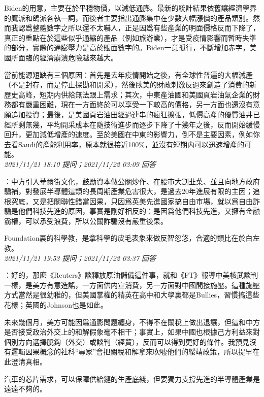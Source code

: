 \documentclass[twocolumn]{ctexart}
\begin{document}
Biden的用意，主要在於平穩物價，以減低通膨。最新的統計結果依舊讓經濟學界的鷹派和鴿派各執一詞，而後者主要指出通膨集中在少數大幅漲價的產品類別。然而我認爲整體數字之所以還不太嚇人，正是因爲有些產業的明面價格反而下降了，真正的重點在於這些似乎通縮的產品（例如旅游業），才是受疫情影響而暫時失準的部分，實際的通膨壓力是高於賬面數字的。Biden一意孤行，不斷增加赤字，美國所面臨的經濟崩潰危險越來越大。

當前能源短缺有三個原因：首先是去年疫情開始之後，有全球性普遍的大幅減產（不是封存，而是停止探勘和開采），然後歐美的財政刺激反過來創造了消費的新歷史高峰，短期内供給無法跟上需求；其次，中東產油國和美國頁岩油氣企業的財務都有嚴重困難，現在一方面終於可以享受一下較高的價格，另一方面也還沒有意願追加投資；最後，是美國頁岩油田經過連串的瘋狂擴張，低價高產的優質油井已經所剩無幾，平均開采成本在隨技術進步而逐步下降了十幾年之後，反而開始緩慢回升，更加減低增產的速度。至於美國在中東的影響力，倒不是主要因素，例如你去看Saudi的產能利用率，原本就很接近100\%，並沒有短期内可以迅速增產的可能。
\\

\textit{\hfill\noindent\small 2021/11/21 18:10 提问；2021/11/22 03:09 回答}

：中方引入華爾街文化，鼓勵資本做公關炒作、在股市大割韭菜、並且向地方政府騙補，對發展半導體這類的長周期產業危害很大，是過去20年進展有限的主因；追根究底，又是把關聯性錯當因果，只因爲英美先進國家搞自由市場，就以爲自由詐騙是他們科技先進的原因，事實是剛好相反的：是因爲他們科技先進，又擁有金融霸權，可以承受浪費，所以公關詐騙沒有嚴重後果。

Foundation裏的科學教，是拿科學的皮毛表象來做反智忽悠，合適的類比在於白左教。
\\

\textit{\hfill\noindent\small 2021/11/21 19:53 提问；2021/11/22 03:37 回答}

：好的，那麽《Reuters》談釋放原油儲備這件事，就和《FT》報導中美核武談判一樣，是美方有意造謠，一方面供内宣消費，另一方面對中國間接施壓。這種施壓方式當然是很幼稚的，但美國掌權的精英在高中和大學裏都是Bullies，習慣搞這些花樣；英國的Johnson也是如此。

未來幾個月，美方可能因爲通膨問題纏身，不得不在關稅上做出退讓，但這和中方是否接受政治外交上的和解假象毫不相干；事實上，如果中國也根據己方利益來對個別方向選擇脫鈎（外交）或談判（經貿），反而可以得到更好的條件。我預見沒有邏輯因果概念的社科“專家”會把關稅和解拿來吹噓他們的綏靖政策，所以提早在此澄清真相。

汽車的芯片需求，可以保障供給鏈的生產底綫，但要獨力支撐先進的半導體產業是遠遠不夠的。
\\
\end{document}
